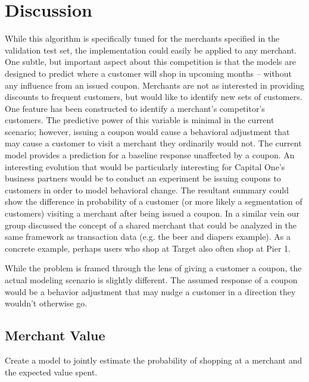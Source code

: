 \documentclass[12pt]{article} %
\begin{document}
\section{Discussion}
While this algorithm is specifically tuned for the merchants specified in the validation test set, the implementation could easily be applied to any merchant.  One subtle, but important aspect about this competition is that the models are designed to predict where a customer will shop in upcoming months -- without any influence from an issued coupon.  Merchants are not as interested in providing discounts to frequent customers, but would like to identify new sets of customers.  One feature has been constructed to identify a merchant's competitor's customers.  The predictive power of this variable is minimal in the current scenario; however, issuing a coupon would cause a behavioral adjustment that may cause a customer to visit a merchant they ordinarily would not.  The current model provides a prediction for a baseline response unaffected by a coupon.  An interesting evolution that would be particularly interesting for Capital One's business partners would be to conduct an experiment be issuing coupons to customers in order to model behavioral change.    The resultant summary could show the difference in probability of a customer (or more likely a segmentation of customers)  visiting a merchant after being issued a coupon.  In a similar vein our group discussed the concept of a shared merchant that could be analyzed in the same framework as transaction data (e.g. the beer and diapers example).  As a concrete example, perhaps users who shop at Target also often shop at Pier 1.




While the problem is framed through the lens of giving a customer a coupon, the actual modeling scenario is slightly different.  The assumed response of a coupon would be a behavior adjustment that may nudge a customer in a direction they wouldn't otherwise go. 

\subsection{Merchant Value}
Create a model to jointly estimate the probability of shopping at a merchant and the expected value spent.
\end{document}
